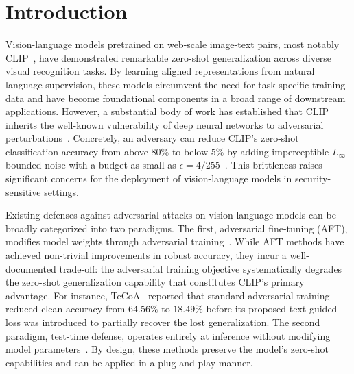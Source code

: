 \documentclass[pdflatex,sn-basic,Numbered]{sn-jnl}
\theoremstyle{thmstyleone}
\theoremstyle{thmstyletwo}
\theoremstyle{thmstylethree}
\begin{document}

\maketitle

\section{Introduction}\label{sec:intro}

Vision-language models pretrained on web-scale image-text pairs, most notably CLIP~\cite{radford2021clip}, have demonstrated remarkable zero-shot generalization across diverse visual recognition tasks. By learning aligned representations from natural language supervision, these models circumvent the need for task-specific training data and have become foundational components in a broad range of downstream applications. However, a substantial body of work has established that CLIP inherits the well-known vulnerability of deep neural networks to adversarial perturbations~\cite{goodfellow2015explaining,madry2018towards,croce2020reliable}. Concretely, an adversary can reduce CLIP's zero-shot classification accuracy from above $80\%$ to below $5\%$ by adding imperceptible $L_\infty$-bounded noise with a budget as small as $\epsilon = 4/255$~\cite{mao2023understanding}. This brittleness raises significant concerns for the deployment of vision-language models in security-sensitive settings.

Existing defenses against adversarial attacks on vision-language models can be broadly categorized into two paradigms. The first, adversarial fine-tuning (AFT), modifies model weights through adversarial training~\cite{mao2023understanding,schlarmann2024robust,xu2024pretrained,chen2025advclip}. While AFT methods have achieved non-trivial improvements in robust accuracy, they incur a well-documented trade-off: the adversarial training objective systematically degrades the zero-shot generalization capability that constitutes CLIP's primary advantage. For instance, TeCoA~\cite{mao2023understanding} reported that standard adversarial training reduced clean accuracy from $64.56\%$ to $18.49\%$ before its proposed text-guided loss was introduced to partially recover the lost generalization. The second paradigm, test-time defense, operates entirely at inference without modifying model parameters~\cite{xing2025clip,jiang2026diversifying,liu2026directional,nie2025contrastive,li2026agc}. By design, these methods preserve the model's zero-shot capabilities and can be applied in a plug-and-play manner.
\end{document}
